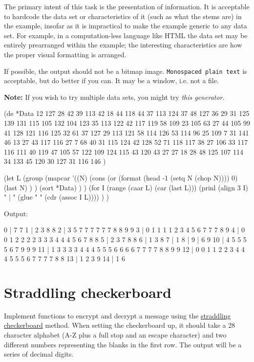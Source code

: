 The primary intent of this task is the presentation of information. It
is acceptable to hardcode the data set or characteristics of it (such as
what the stems are) in the example, insofar as it is impractical to make
the example generic to any data set. For example, in a computation-less
language like HTML the data set may be entirely prearranged within the
example; the interesting characteristics are how the proper visual
formatting is arranged.

If possible, the output should not be a bitmap image.
\texttt{Monospaced plain text} is acceptable, but do better if you can.
It may be a window, i.e. not a file.

\textbf{Note:} If you wish to try multiple data sets, you might try
\emph{this generator}.


\begin{wideverbatim}

(de *Data
   12 127 28 42 39 113 42 18 44 118 44 37 113 124 37 48 127 36
   29 31 125 139 131 115 105 132 104 123 35 113 122 42 117 119
   58 109 23 105 63 27 44 105 99 41 128 121 116 125 32 61 37 127
   29 113 121 58 114 126 53 114 96 25 109 7 31 141 46 13 27 43
   117 116 27 7 68 40 31 115 124 42 128 52 71 118 117 38 27 106
   33 117 116 111 40 119 47 105 57 122 109 124 115 43 120 43 27
   27 18 28 48 125 107 114 34 133 45 120 30 127 31 116 146 )

(let L
   (group
      (mapcar
         '((N)
            (cons
               (or (format (head -1 (setq N (chop N)))) 0)
               (last N) ) )
         (sort *Data) ) )
   (for I (range (caar L) (car (last L)))
      (prinl (align 3 I) " | " (glue " " (cdr (assoc I L)))) ) )

Output:

  0 | 7 7
  1 | 2 3 8 8
  2 | 3 5 7 7 7 7 7 7 8 8 9 9
  3 | 0 1 1 1 1 2 3 4 5 6 7 7 7 8 9
  4 | 0 0 1 2 2 2 2 3 3 3 4 4 4 5 6 7 8 8
  5 | 2 3 7 8 8
  6 | 1 3 8
  7 | 1
  8 |
  9 | 6 9
 10 | 4 5 5 5 5 6 7 9 9 9
 11 | 1 3 3 3 3 4 4 4 5 5 5 6 6 6 6 7 7 7 7 8 8 9 9
 12 | 0 0 1 1 2 2 3 4 4 4 5 5 5 6 7 7 7 7 8 8
 13 | 1 2 3 9
 14 | 1 6

\end{wideverbatim}

\pagebreak{}
\section*{Straddling checkerboard}

Implement functions to encrypt and decrypt a message using the
\href{http://en.wikipedia.org/wiki/Straddling\_checkerboard}{straddling
checkerboard} method. When setting the checkerboard up, it should take a
28 character alphabet (A-Z plus a full stop and an escape character) and
two different numbers representing the blanks in the first row. The
output will be a series of decimal digits.

